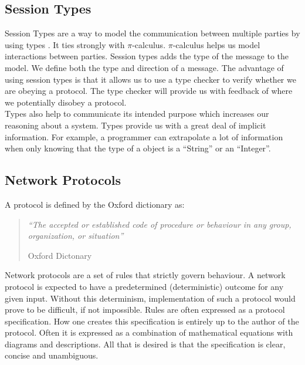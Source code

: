 \subsection{Session Types}
Session Types are a way to model the communication between multiple parties by using types \cite{dardha2012session}. It ties strongly with $\pi$-calculus. $\pi$-calculus helps us model interactions between parties. Session types adds the type of the message to the model. We define both the type and direction of a message. The advantage of using session types is that it allows us to use a type checker to verify whether we are obeying a protocol. The type checker will provide us with feedback of where we potentially disobey a protocol.
\\
Types also help to communicate its intended purpose which increases our reasoning about a system. Types provide us with a great deal of implicit information. For example, a programmer can extrapolate a lot of information when only knowing that the type of a object is a ``String'' or an ``Integer''.



\subsection{Network Protocols}
A protocol is defined by the Oxford dictionary as:
\begin{quote}
	\textit{``The accepted or established code of procedure or behaviour in any group, organization, or situation''}
	\begin{flushright}
		Oxford Dictonary%
	\end{flushright}
\end{quote}


Network protocols are a set of rules that strictly govern behaviour. A network protocol is expected to have a predetermined (deterministic) outcome for any given input. Without this determinism, implementation of such a protocol would prove to be difficult, if not impossible. Rules are often expressed as a protocol specification. How one creates this specification is entirely up to the author of the protocol. Often it is expressed as a combination of mathematical equations with diagrams and descriptions.  All that is desired is that the specification is clear, concise and unambiguous.
